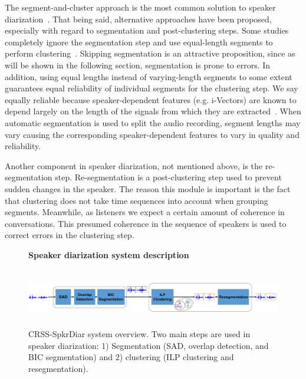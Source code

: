 The segment-and-cluster approach is the most common solution to speaker diarization~\cite{meignier2010lium,anguera2012diarization}. 
That being said, alternative approaches have been proposed, 
especially with regard to segmentation and post-clustering steps. 
Some studies completely ignore the segmentation step and use equal-length segments to perform clustering~\cite{sell_garcia_2015diarization}. 
Skipping segmentation is an attractive proposition, since as will be shown in the following section, segmentation is prone to errors. 
In addition, using equal lengths instead of varying-length segments to some extent guarantees equal reliability of individual segments for the clustering step. 
We say equally reliable because speaker-dependent features (e.g. i-Vectors) are known to depend largely on the length of the signals from which they are extracted~\cite{hasan2013duration}. 
When automatic segmentation is used to split the audio recording, segment lengths may vary causing the corresponding speaker-dependent features to vary in quality and reliability. 

Another component in speaker diarization, not mentioned above, is the re-segmentation step. 
Re-segmentation is a post-clustering step used to prevent sudden changes in the speaker. 
The reason this module is important is the fact that clustering does not take time sequences into account when grouping segments. 
Meanwhile, as listeners we expect a certain amount of coherence in conversations. 
This presumed coherence in the sequence of speakers is used to correct errors in the clustering step. 

\begin{figure}[t!]
	\centering
	\textbf{Speaker diarization system description}\par\medskip
	\includegraphics[height = 1in, width=1\textwidth]{figures/crssdiar_outline}
	\caption{ \small CRSS-SpkrDiar system overview. Two main steps are used in speaker diarization: 1) Segmentation (SAD, overlap detection, and BIC segmentation) and 2) clustering (ILP clustering and resegmentation). }
	\label{fig:ch5_crssdiar}
	\vspace{-3mm}
\end{figure}


